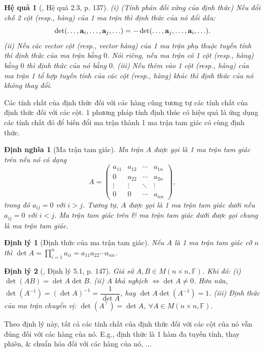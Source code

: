 \documentclass{article}
\newtheorem{dinhly}{Định lý}
\newtheorem{dinhnghia}{Định nghĩa}
\newtheorem{hequa}{Hệ quả}
\begin{document}
\begin{hequa}[\cite{Hung_linear_algebra}, Hệ quả 2.3, p. 137]
	(i) {\rm(Tính phản đối xứng của định thức)} Nếu đổi chỗ 2 cột (resp., hàng) của 1 ma trận thì định thức của nó đổi dấu:
	\begin{equation*}
		\det(\ldots,{\bf a}_i,\ldots,{\bf a}_j,\ldots) = -\det(\ldots,{\bf a}_j,\ldots,{\bf a}_i,\ldots).
	\end{equation*}
	(ii) Nếu các vector cột (resp., vector hàng) của 1 ma trận phụ thuộc tuyến tính thì định thức của ma trận bằng $0$. Nói riêng, nếu ma trận có 1 cột (resp., hàng) bằng $0$ thì định thức của nó bằng $0$. (iii) Nếu thêm vào 1 cột (resp., hàng) của ma trận 1 tổ hợp tuyến tính của các cột (resp., hàng) khác thì định thức của nó không thay đổi.
\end{hequa}
Các tính chất của định thức đối với các hàng cũng tương tự các tính chất của định thức đối với các cột. 1 phương pháp tính định thúc có hiệu quả là ứng dụng các tính chất đó để biến đổi ma trận thành 1 ma trận tam giác có cùng định thức.

\begin{dinhnghia}[Ma trận tam giác]
	Ma trận $A$ được gọi là 1 {\rm ma trận tam giác trên} nếu nó có dạng
	\begin{equation*}
		A = \begin{pmatrix}
			a_{11} & a_{12} & \cdots & a_{1n}\\0 & a_{22} & \cdots & a_{2n}\\
			\vdots & \vdots & \ddots & \vdots\\0 & 0 & \cdots & a_{nn}
		\end{pmatrix},
	\end{equation*}
	trong đó $a_{ij} = 0$ với $i > j$. Tương tự, $A$ được gọi là 1 {\rm ma trận tam giác dưới} nếu $a_{ij} = 0$ với $i < j$. Ma trận tam giác trên \& ma trận tam giác dưới được gọi chung là {\rm ma trận tam giác}.
\end{dinhnghia}

\begin{dinhly}[Định thức của ma trận tam giác]
	Nếu $A$ là 1 ma trận tam giác cỡ $n$ thì $\det A = \prod_{i=1}^n a_{ii} = a_{11}a_{22}\cdots a_{nn}$.
\end{dinhly}

\begin{dinhly}[\cite{Hung_linear_algebra}, Định lý 5.1, p. 147]
	Giả sử $A,B\in M(n\times n,\mathbb{F})$. Khi đó: (i) $\det(AB) = \det A\det B$. (ii) $A$ khả nghịch $\Leftrightarrow\det A\ne0$. Hơn nữa, $\det(A^{-1}) = (\det A)^{-1} = \dfrac{1}{\det A}$, hay $\det A\det(A^{-1}) = 1$. (iii) Định thức của ma trận chuyển vị: $\det(A^\top) = \det A$, $\forall A\in M(n\times n,\mathbb{F})$.
\end{dinhly}
Theo định lý này, tất cả các tính chất của định thức đối với các cột của nó vẫn đúng đối với các hàng của nó. E.g., định thức là 1 hàm đa tuyến tính, thay phiên, \& chuẩn hóa đối với các hàng của nó, $\ldots$
\end{document}
